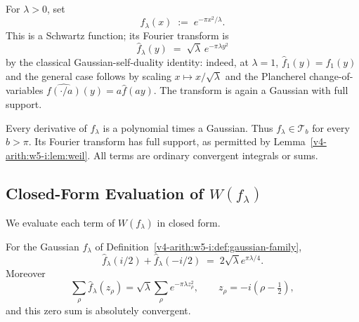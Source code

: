 \begin{definition}
\label{v4-arith:w5-i:def:gaussian-family}
For \(\lambda>0\), set
\begin{equation}
\label{v4-arith:w5-i:eq:f-lambda}
f_{\lambda}(x)\;:=\;e^{-\pi x^{2}/\lambda}.
\end{equation}
This is a Schwartz function; its Fourier transform is
\begin{equation}
\label{v4-arith:w5-i:eq:f-lambda-hat}
\widehat{f}_{\lambda}(y)\;=\;\sqrt{\lambda}\,e^{-\pi\lambda y^{2}}
\end{equation}
by the classical Gaussian-self-duality identity: indeed, at
\(\lambda=1\), \(\widehat{f}_{1}(y)=f_{1}(y)\) and the general case
follows by scaling \(x\mapsto x/\sqrt{\lambda}\) and the Plancherel
change-of-variables \(\widehat{f(\cdot/a)}(y)=a\widehat{f}(ay)\).
The transform is again a Gaussian with full support.
\end{definition}

\begin{remark}
\label{v4-arith:w5-i:rem:gauss-admissibility}
Every derivative of $f_\lambda$ is a polynomial times a Gaussian.
Thus $f_\lambda\in\mathcal T_b$ for every $b>\pi$.
Its Fourier transform has full support, as permitted by
Lemma~\ref{v4-arith:w5-i:lem:weil}.
All terms are ordinary convergent integrals or sums.
\end{remark}

\subsection{Closed-Form Evaluation of \(W(f_{\lambda})\)}
\label{v4-arith:w5-i:weil-gauss-closed-form}

We evaluate each term of \(W(f_{\lambda})\) in closed form.

\begin{lemma}
\label{v4-arith:w5-i:lem:pole-zero}
For the Gaussian \(f_{\lambda}\) of
Definition~\ref{v4-arith:w5-i:def:gaussian-family},
\begin{equation}
\label{v4-arith:w5-i:eq:pole-zero}
\widehat{f}_{\lambda}(i/2)+\widehat{f}_{\lambda}(-i/2)\;=\;2\sqrt{\lambda}e^{\pi\lambda/4}.
\end{equation}
Moreover
\[
\sum_{\rho}\widehat{f}_{\lambda}(z_{\rho})
=\sqrt{\lambda}\sum_{\rho}e^{-\pi\lambda z_{\rho}^{2}},
\qquad z_{\rho}=-i(\rho-\tfrac12),
\]
and this zero sum is absolutely convergent.
\end{lemma}

